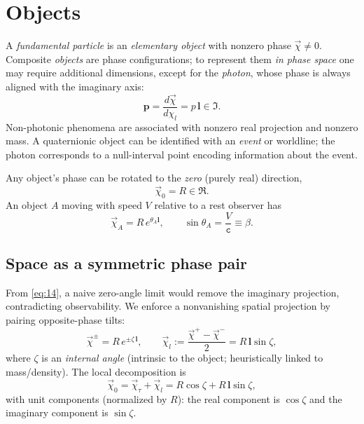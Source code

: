 \documentclass[11pt]{article}
\numberwithin{equation}{section}
\begin{document}
\section{Objects}
A \emph{fundamental particle} is an \emph{elementary object} with nonzero phase $\vec{\chi}\neq0$. Composite \emph{objects} are phase configurations; to represent them \emph{in phase space} one may require additional dimensions, except for the \emph{photon}, whose phase is always aligned with the imaginary axis:
\begin{equation}
\mathbf{p}=\frac{d\vec{\chi}}{d\chi_l}=p\,\mathbf{l}\in\Im.
\label{eq:31}
\end{equation}
Non-photonic phenomena are associated with nonzero real projection and nonzero mass. A quaternionic object can be identified with an \emph{event} or worldline; the photon corresponds to a null-interval point encoding information about the event.

Any object's phase can be rotated to the \emph{zero} (purely real) direction,
\begin{equation}
\vec{\chi}_0=R\in\Re.
\label{eq:32}
\end{equation}
An object $A$ moving with speed $V$ relative to a rest observer has
\begin{equation}
\vec{\chi}_A=R\,e^{\theta_A\mathbf{l}},\qquad
\sin\theta_A=\frac{V}{\mathtt{c}}\equiv\beta.
\label{eq:33}
\end{equation}

\subsection{Space as a symmetric phase pair}
From \eqref{eq:14}, a naive zero-angle limit would remove the imaginary projection, contradicting observability. We enforce a nonvanishing spatial projection by pairing opposite-phase tilts:
\begin{equation}
\vec{\chi}^{\pm}=R\,e^{\pm\zeta\,\mathbf{l}},\qquad
\vec{\chi}_l:=\frac{\vec{\chi}^+-\vec{\chi}^-}{2}=R\,\mathbf{l}\sin\zeta,
\label{eq:311}
\end{equation}
where $\zeta$ is an \emph{internal angle} (intrinsic to the object; heuristically linked to mass/density). The local decomposition is
\begin{equation}
\vec{\chi}_0=\vec{\chi}_\tau+\vec{\chi}_l
=R\cos\zeta+R\,\mathbf{l}\sin\zeta,
\label{eq:312}
\end{equation}
with unit components (normalized by $R$): the real component is $\cos\zeta$ and the imaginary component is $\sin\zeta$.
\end{document}
